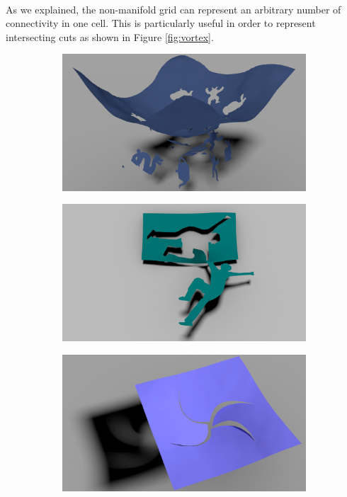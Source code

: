 \paragraph*{}
As we explained, the non-manifold grid can represent an arbitrary number of connectivity in one cell. This is particularly useful in order to represent intersecting cuts as shown in Figure \ref{fig:vortex}.

\begin{figure}[!h]
	\centering
	\begin{subfigure}[b]{0.32\linewidth}
		\centering
		\includegraphics[width=\linewidth]{images/cutting-mig2015/Patchwork.pdf}
		\caption{\label{fig:patchwork}}
	\end{subfigure}
	\hfill
	\begin{subfigure}[b]{0.32\linewidth}
		\centering
		\includegraphics[width=\linewidth]{images/cutting-mig2015/FallingGuy.pdf}
		\caption{\label{fig:fallingguy}}
	\end{subfigure}
	\hfill
	\begin{subfigure}[b]{0.32\linewidth}
		\centering
		\includegraphics[width=\linewidth]{images/cutting-mig2015/Vortex.pdf}

\end{subfigure}
\end{figure}
